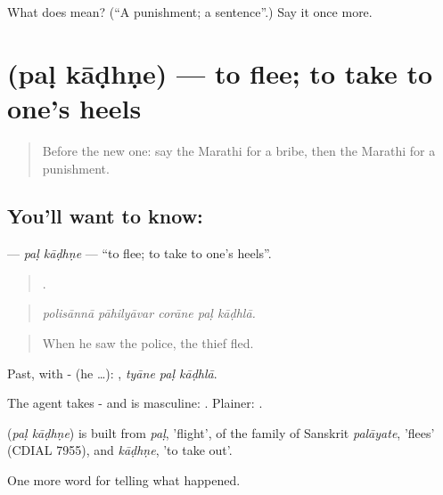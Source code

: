 \begin{tcolorbox}[breakable,colback=teal!4,colframe=teal!35!black,title={Before you move on}]
What does  mean? (\textquotedblleft{}A punishment; a sentence\textquotedblright{}.) Say it once more.
\end{tcolorbox}
\section[\texorpdfstring{\mr{पळ} \mr{काढणे} (paḷ kāḍhṇe)}{पळ काढणे (paḷ kāḍhṇe)}]{  (paḷ kāḍhṇe) — to flee; to take to one's heels}

\label{lesson:MR-C300-pal-kadhne}



\begin{quote}
Before the new one: say the Marathi for a bribe, then the Marathi for a punishment.
\end{quote}

\subsection*{You'll want to know:  }
\textbf{ } — \emph{paḷ kāḍhṇe} — \textquotedblleft{}to flee; to take to one's heels\textquotedblright{}.

\begin{quote}
    .
\end{quote}

\begin{quote}
\emph{polisānnā pāhilyāvar corāne paḷ kāḍhlā.}
\end{quote}

\begin{quote}
When he saw the police, the thief fled.
\end{quote}

Past, with - (he …):   , \emph{tyāne paḷ kāḍhlā}.

The agent takes - and  is masculine:   . Plainer:  .

\begin{cousinweb}
\textbf{ } (\emph{paḷ kāḍhṇe}) is built from \emph{paḷ}, 'flight', of the family of Sanskrit \emph{palāyate}, 'flees' (CDIAL 7955), and \emph{kāḍhṇe}, 'to take out'.
\end{cousinweb}

\begin{grammarlens}[title={What you've built}]
One more word for telling what happened.
\end{grammarlens}

